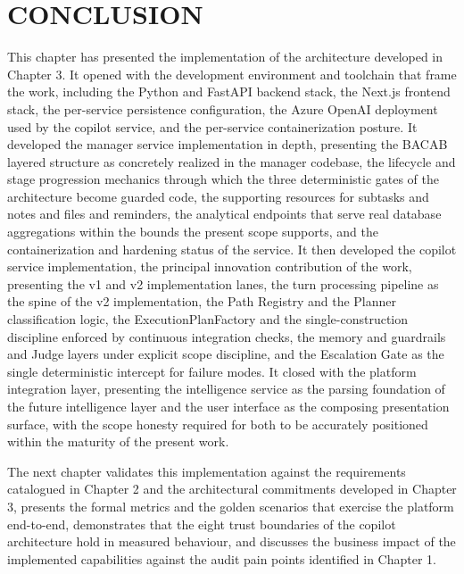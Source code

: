 \section{CONCLUSION}
This chapter has presented the implementation of the architecture developed in Chapter 3. It opened with the development environment and toolchain that frame the work, including the Python and FastAPI backend stack, the Next.js frontend stack, the per-service persistence configuration, the Azure OpenAI deployment used by the copilot service, and the per-service containerization posture. It developed the manager service implementation in depth, presenting the BACAB layered structure as concretely realized in the manager codebase, the lifecycle and stage progression mechanics through which the three deterministic gates of the architecture become guarded code, the supporting resources for subtasks and notes and files and reminders, the analytical endpoints that serve real database aggregations within the bounds the present scope supports, and the containerization and hardening status of the service. It then developed the copilot service implementation, the principal innovation contribution of the work, presenting the v1 and v2 implementation lanes, the turn processing pipeline as the spine of the v2 implementation, the Path Registry and the Planner classification logic, the ExecutionPlanFactory and the single-construction discipline enforced by continuous integration checks, the memory and guardrails and Judge layers under explicit scope discipline, and the Escalation Gate as the single deterministic intercept for failure modes. It closed with the platform integration layer, presenting the intelligence service as the parsing foundation of the future intelligence layer and the user interface as the composing presentation surface, with the scope honesty required for both to be accurately positioned within the maturity of the present work.

The next chapter validates this implementation against the requirements catalogued in Chapter 2 and the architectural commitments developed in Chapter 3, presents the formal metrics and the golden scenarios that exercise the platform end-to-end, demonstrates that the eight trust boundaries of the copilot architecture hold in measured behaviour, and discusses the business impact of the implemented capabilities against the audit pain points identified in Chapter 1.